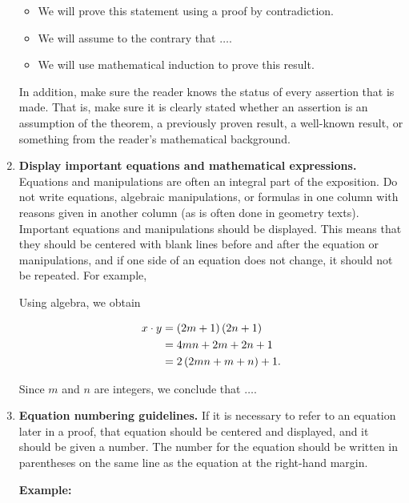 \begin{enumerate}
\begin{itemize}

\item We will prove this statement using a proof by contradiction.

\item We will assume to the contrary that $\ldots .$

\item We will use mathematical induction to prove this result.
\end{itemize}

In addition, make sure the reader knows the status of every assertion that is made.  That is, make sure it is clearly stated whether an assertion is an assumption of the theorem, a previously proven result, a well-known result, or something from the reader's mathematical background.


\item \textbf{Display important equations and mathematical expressions.}
Equations and manipulations are often an integral part of the exposition.  Do not write equations, algebraic manipulations, or formulas in one column with reasons given in another column (as is often done in geometry texts).   Important equations and manipulations should be displayed.  This means that they should be centered with blank lines before and after the equation or manipulations, and if one side of an equation does not change, it should not be repeated.  For example,

Using algebra, we obtain
	
\begin{align}
  x \cdot y &= \left( {2m + 1} \right)\left( {2n + 1} \right)  \notag \\ 
            &= 4mn + 2m + 2n + 1  \notag \\ 
            &= 2\left( {2mn + m + n} \right) + 1.  \notag  
\end{align} 

Since  $m$  and  $n$  are integers, we conclude that $ \ldots .$


\item \textbf{Equation numbering guidelines.} 
If it is necessary to refer to an equation later in a proof, that equation should be centered and displayed, and it should be given a number.  The number for the equation should be written in parentheses on the same line as the equation at the right-hand margin.

\textbf{Example:}
\setcounter{equation}{0}


\end{enumerate}
